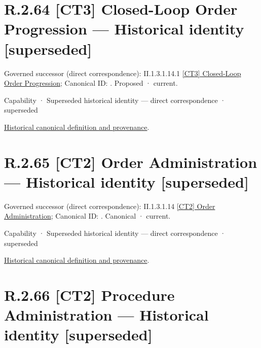 \section*{R.2.64 [CT3] Closed-Loop Order Progression — Historical identity [superseded]}
\label{navigation:R.2.64}

{\small Governed successor (direct correspondence): II.1.3.1.14.1 \hyperref[element:2f79ebd7392c46ef92def6f25bc9c7ce]{[CT3] Closed-Loop Order Progression}; Canonical ID: \texttt{}. Proposed · current.}\par
\label{element:2ad29cebc1e94053a300d869e7797232}
{\small Capability · Superseded historical identity — direct correspondence · superseded}\par
\href{../../../../continuum/strategy/capability/2ad29cebc1e94053a300d869e7797232.md}{Historical canonical definition and provenance}.\par
\section*{R.2.65 [CT2] Order Administration — Historical identity [superseded]}
\label{navigation:R.2.65}

{\small Governed successor (direct correspondence): II.1.3.1.14 \hyperref[element:c3c5abd7987f4433a46cbfed8167914c]{[CT2] Order Administration}; Canonical ID: \texttt{}. Canonical · current.}\par
\label{element:ebb735a2915744819d4001d9b8425cc6}
{\small Capability · Superseded historical identity — direct correspondence · superseded}\par
\href{../../../../continuum/strategy/capability/ebb735a2915744819d4001d9b8425cc6.md}{Historical canonical definition and provenance}.\par
\section*{R.2.66 [CT2] Procedure Administration — Historical identity [superseded]}
\label{navigation:R.2.66}

